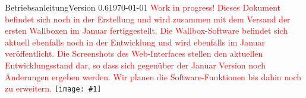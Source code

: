\documentclass[a4paper,10pt]{article}
\title{}
\author{}
\newcommand{\gfx}[1]{\texttt{[image: \#1]}}
\begin{document}
\begin{titlepage}
	Betriebsanleitung\hfill Version 0.6\hfill \today \centering \vfill
	\colorbox{boxgray}{} \vfill \textcolor{red}{Work in progress!} \vfill
	\textcolor{red}{Dieses Dokument befindet sich noch in der Erstellung und wird zusammen mit dem
		Versand der ersten Wallboxen im Januar fertiggestellt. Die Wallbox-Software
		befindet sich aktuell ebenfalls noch in der Entwicklung und wird ebenfalls im
		Januar veröffentlicht. Die Screenshots des Web-Interfaces stellen den aktuellen
		Entwicklungsstand dar, so dass sich gegenüber der Januar Version noch Änderungen ergeben werden. Wir
		planen die Software-Funktionen bis dahin noch zu erweitern.} \vfill \gfx{./img/resized/warp_perspective_blue_ready}
\end{titlepage}
\end{document}
